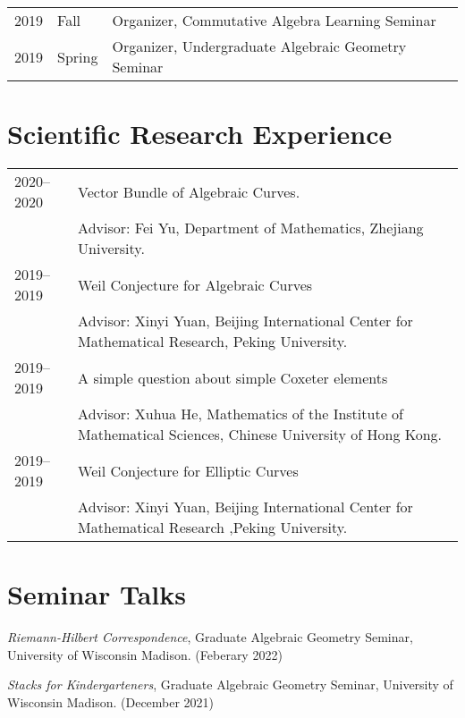 \documentclass[margin,line,pifont,palatino,courier]{res}
\begin{document}
\begin{resume}
\begin{tabular}{@{}p{0.4in}p{0.3in}p{4in}}
	
	2019 & Fall & Organizer, Commutative Algebra Learning Seminar\\
	
	2019 & Spring & Organizer, Undergraduate Algebraic Geometry Seminar\\
\end{tabular}



\section{\sc Scientific Research Experience}

\begin{tabular}{@{}p{0.8in}p{4in}}

2020--2020 & Vector Bundle of Algebraic Curves. \\
& \hspace{0.2in} Advisor: Fei Yu, Department of Mathematics, Zhejiang University.\\


2019--2019 & Weil Conjecture for Algebraic Curves \\
& \hspace{0.2in} Advisor: Xinyi Yuan, Beijing International Center for Mathematical Research, Peking University. \\


2019--2019 & A simple question about simple Coxeter elements \\
& \hspace{0.2in} Advisor: Xuhua He, Mathematics of the Institute of Mathematical Sciences,  Chinese University of Hong Kong.\\

2019--2019 & Weil Conjecture for  Elliptic Curves \\
& \hspace{0.2in} Advisor: Xinyi Yuan, Beijing International Center for Mathematical Research ,Peking University.\\

\end{tabular}


\section{\sc Seminar Talks}

\emph{Riemann-Hilbert Correspondence}, Graduate Algebraic Geometry Seminar,
University of Wisconsin Madison. (Feberary  2022)


\emph{Stacks for Kindergarteners}, Graduate Algebraic Geometry Seminar,
University of Wisconsin Madison. (December  2021)


\end{resume}
\end{document}

